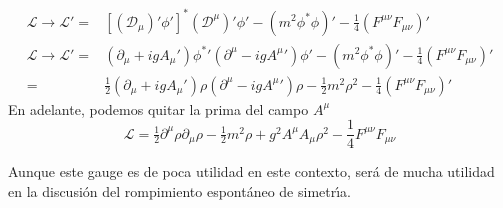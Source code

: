 \begin{example}

\begin{align}
  \mathcal{L}\to\mathcal{L}'=&\left[\left(\mathcal{D}_\mu\right)'\phi'\right]^*\left(\mathcal{D}^\mu\right)'\phi'-\left(m^2\phi^*\phi\right)'-\frac{1}{4}\left(F^{\mu\nu}F_{\mu\nu}\right)'\nonumber\\
  \mathcal{L}\to\mathcal{L}'=&\left(\partial_\mu+ig{A_\mu}'\right){\phi^*}'\left(\partial^\mu-ig{A^\mu}'\right)\phi'-\left(m^2\phi^*\phi\right)'-\frac{1}{4}\left(F^{\mu\nu}F_{\mu\nu}\right)'\nonumber\\
=&\tfrac{1}{2}\left(\partial_\mu+ig{A_\mu}'\right)\rho\left(\partial^\mu-ig{A^\mu}'\right)\rho-\tfrac{1}{2}m^2\rho^2-\frac{1}{4}\left(F^{\mu\nu}F_{\mu\nu}\right)'\nonumber
\end{align}
En adelante, podemos quitar la prima del campo $A^\mu$
\begin{equation}
  \mathcal{L}=\tfrac{1}{2}\partial^\mu\rho\partial_\mu\rho-\tfrac{1}{2}m^2\rho+g^2A^\mu A_\mu\rho^2-\frac{1}{4}F^{\mu\nu}F_{\mu\nu}
\end{equation}

Aunque este gauge es de poca utilidad en este contexto, ser\'a de mucha utilidad en la discusi\'on del rompimiento espont\'aneo de simetr\'\i a.
\end{example} %

